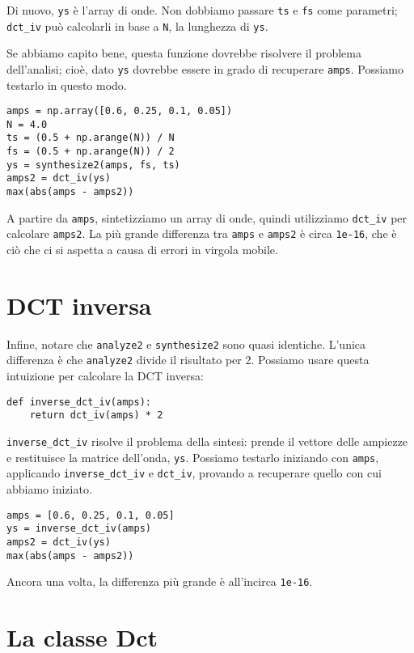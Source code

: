 \documentclass[12pt,a4paper]{book}
\begin{document}
Di nuovo, {\tt ys} è l'array di onde. Non dobbiamo passare {\tt ts} e {\tt fs} come parametri; \verb"dct_iv" può calcolarli in base a {\tt N}, la lunghezza di {\tt ys}.

Se abbiamo capito bene, questa funzione dovrebbe risolvere il problema dell'analisi; cioè, dato {\tt ys} dovrebbe essere in grado di recuperare {\tt amps}. Possiamo testarlo in questo modo.

\begin{verbatim} 
amps = np.array([0.6, 0.25, 0.1, 0.05])
N = 4.0
ts = (0.5 + np.arange(N)) / N
fs = (0.5 + np.arange(N)) / 2
ys = synthesize2(amps, fs, ts)
amps2 = dct_iv(ys)
max(abs(amps - amps2))
 \end{verbatim} 

A partire da {\tt amps}, sintetizziamo un array di onde, quindi utilizziamo \verb"dct_iv" per calcolare {\tt amps2}. La più grande differenza tra {\tt amps} e {\tt amps2} è circa {\tt 1e-16}, che è ciò che ci si aspetta a causa di errori in virgola mobile.

\section{DCT inversa} 

Infine, notare che {\tt analyze2} e {\tt synthesize2} sono quasi identiche. L'unica differenza è che {\tt analyze2} divide il risultato per 2. Possiamo usare questa intuizione per calcolare la DCT inversa:

\begin{verbatim} 
def inverse_dct_iv(amps):
    return dct_iv(amps) * 2
 \end{verbatim} 

\verb"inverse_dct_iv" risolve il problema della sintesi: prende il vettore delle ampiezze e restituisce la matrice dell'onda, {\tt ys}. Possiamo testarlo iniziando con {\tt amps}, applicando \verb"inverse_dct_iv" e \verb"dct_iv", provando a recuperare quello con cui abbiamo iniziato.

\begin{verbatim} 
amps = [0.6, 0.25, 0.1, 0.05]
ys = inverse_dct_iv(amps)
amps2 = dct_iv(ys)
max(abs(amps - amps2))
 \end{verbatim} 

Ancora una volta, la differenza più grande è all'incirca {\tt 1e-16}.

\section{La classe Dct} 
\end{document}
